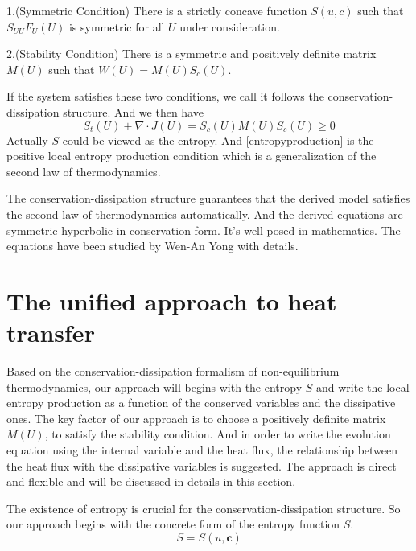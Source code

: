 \documentclass[a4paper]{article}
\begin{document}
1.(Symmetric Condition) There is a strictly concave function $S(u,c)$ such that $S_{UU} F_U(U)$ is symmetric for all $U$ under consideration.

2.(Stability Condition) There is a symmetric and positively definite matrix $M(U)$ such that $W(U)=M(U)S_c(U)$.

If the system satisfies these two conditions, we call it follows the conservation-dissipation structure. And we then have
\begin{equation}\label{entropyproduction}
S_t(U)+\nabla \cdot J(U)=S_c(U)M(U)S_c(U) \ge 0
\end{equation}
Actually $S$ could be viewed as the entropy. And \eqref{entropyproduction} is the positive local entropy production condition which is a generalization of the second law of thermodynamics.

The  conservation-dissipation structure guarantees that the derived model satisfies the second law of thermodynamics automatically. And the derived equations are symmetric hyperbolic in conservation form. It's well-posed in mathematics\cite{friedrichs1971systems}. The equations have been studied by Wen-An Yong with details\cite{yong2008interesting,yong1999singular,kawashima2004dissipative}.


\section{The unified approach to heat transfer}
Based on the conservation-dissipation formalism of non-equilibrium thermodynamics, our approach will begins with the entropy $S$ and write the local entropy production as a function of the conserved variables and the dissipative ones. The key factor of our approach is to choose a positively definite matrix $M(U)$, to satisfy the stability condition. And in order to write the evolution equation using the internal variable and the heat flux, the relationship between the heat flux with the dissipative variables is suggested. The approach is direct and flexible and will be discussed in details in this section.

The existence of entropy is crucial for the conservation-dissipation structure. So our approach begins with the concrete form of the entropy function $S$. 
\begin{equation}\label{entropyform}
S=S(u,\mathbf{c})
\end{equation}
\end{document}
